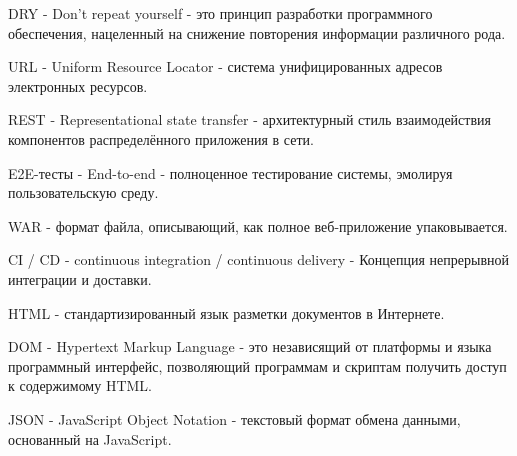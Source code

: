 DRY - Don't repeat yourself - это принцип разработки программного обеспечения, нацеленный на снижение повторения информации различного рода.

URL - Uniform Resource Locator - система унифицированных адресов электронных ресурсов.

REST - Representational state transfer -  архитектурный стиль взаимодействия компонентов распределённого приложения в сети.

E2E-тесты - End-to-end - полноценное тестирование системы, эмолируя пользовательскую среду.

WAR - формат файла, описывающий, как полное веб-приложение упаковывается.

CI / CD - continuous integration / continuous delivery - Концепция непрерывной интеграции и доставки.

HTML - стандартизированный язык разметки документов в Интернете.

DOM - Hypertext Markup Language - это независящий от платформы и языка программный интерфейс, позволяющий программам и скриптам получить доступ к содержимому HTML.

JSON - JavaScript Object Notation - текстовый формат обмена данными, основанный на JavaScript.
